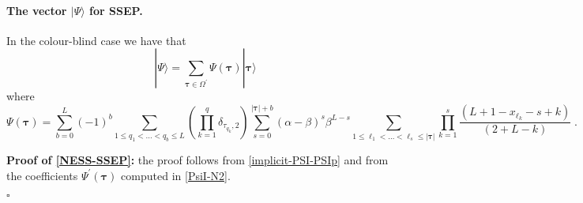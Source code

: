 \documentclass[10pt]{article}
\numberwithin{equation}{section}
\numberwithin{equation}{subsection}
\newcommand{\dt}{\;.}
\begin{document}
\paragraph{The vector $|\Psi\rangle$ for SSEP.}
In the colour-blind case we have that 
\begin{equation}\label{NESS-SSEP}
	|\Psi\rangle=\sum_{\bm{\tau}\in \Omega^{'}}\Psi(\bm{\tau})|\bm{\tau}\rangle
\end{equation}
where
\begin{equation}
	\Psi(\bm{\tau})=\sum_{b=0}^{L}(-1)^{b}\sum_{1\leq q_{1}<\ldots<q_{b}\leq L}\left(\prod_{k=1}^{q}\delta_{\tau_{q_{k}},2}\right)\sum_{s=0}^{|\bm{\tau}|+b}(\alpha-\beta)^{s}\beta^{L-s}\sum_{1\leq \ell_{1}<\ldots<\ell_{s}\leq |\bm{\tau}|}\prod_{k=1}^{s}\frac{\left(L+1-x_{\ell_{k}}-s+k\right)}{(2+L-k)}\dt
\end{equation}

\textbf{Proof of \eqref{NESS-SSEP}:} the proof follows from \eqref{implicit-PSI-PSIp} and from the coefficients $\Psi^{'}(\bm{\tau})$ computed in \eqref{PsiI-N2}. 
\begin{flushright}
	$\square$
\end{flushright}
\end{document}
